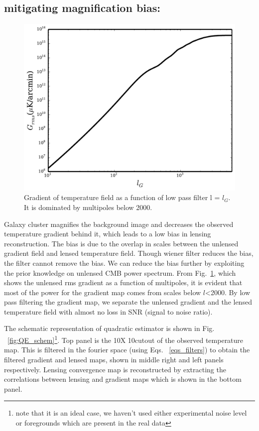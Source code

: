   \subsection*{mitigating magnification bias:}
\begin{figure}[ht]
\includegraphics[width=\columnwidth]{figs/gradient_cut.pdf}
\caption{Gradient of temperature field as a function of low pass filter l = $l_{G}$. It is dominated by multipoles below 2000.}
\label{fig:gradient_cut}
\end{figure}
Galaxy cluster magnifies the background image and decreases the observed temperature gradient behind it, which leads to a low bias in lensing reconstruction.
The bias is due to the overlap in scales between the unlensed gradient field and lensed temperature field. 
Though wiener filter reduces the bias, the filter cannot remove the bias.
We can reduce the bias further by exploiting the prior knowledge on unlensed CMB power spectrum.
 From Fig.~\ref{fig:gradient_cut}, which shows the unlensed rms gradient as a function of multipoles, it is evident that most of the power for the gradient map comes from scales below $l$<2000.
 By low pass filtering the gradient map, we separate the unlensed gradient and the lensed temperature field with almost no loss in SNR (signal to noise ratio).
 
The schematic representation of quadratic estimator is shown in Fig. ~\ref{fig:QE_schem}\footnote{note that it is an ideal case, we haven't used either experimental noise level or foregrounds which are present in the real data}. 
Top panel is the 10\arcmin X 10\arcmin cutout of the observed temperature map.
This is filtered in the fourier space (using Eqs. ~\ref{eqs_filters}) to obtain the filtered gradient and lensed maps, shown in middle right and left panels respectively.
Lensing convergence map is reconstructed by extracting the correlations between lensing and gradient maps which is shown in the bottom panel.
 
